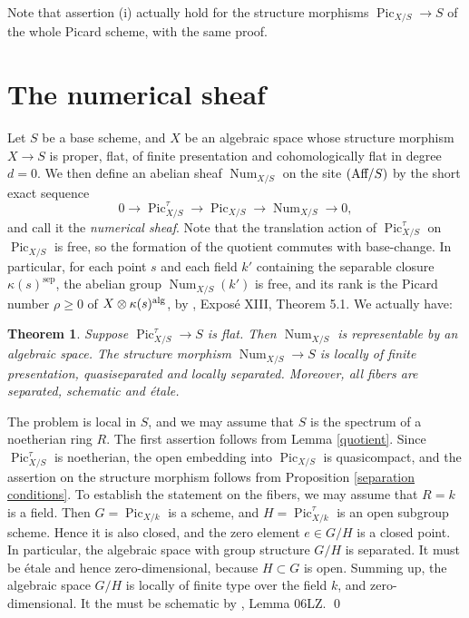 \documentclass[oneside, 12pt]{amsart}
\newcommand\mylabel[1]{\label{#1}\marginpar{\raggedright\vspace{-1ex}\medskip\medskip\footnotesize \tt #1}}
\renewcommand\mylabel[1]{\label{#1}}
\newtheorem{theorem}{Theorem}[section]
\theoremstyle{definition}
\theoremstyle{remark}
\newcommand{\Aff}{\text{\rm Aff}}
\newcommand{\alg}{\text{\rm alg}}
\newcommand{\lra}{\longrightarrow}
\newcommand{\Num}{\operatorname{Num}}
\newcommand{\Pic}{\operatorname{Pic}}
\newcommand{\ra}{\rightarrow}
\newcommand{\sep}{{\operatorname{sep}}}
\begin{document}
\medskip
Note that assertion (i) actually hold for the structure morphisms $\Pic_{X/S}\ra S$ of the whole Picard scheme,
with the same proof.


\section{The numerical sheaf}
\mylabel{Numerical sheaf}

Let $S$ be a base scheme, and $X$ be an algebraic space whose structure morphism $X\ra S$ is proper,
flat, of finite presentation and cohomologically flat in degree $d=0$.
We then define an abelian sheaf $\Num_{X/S}$ on the site $(\Aff/S)$ by the short exact sequence
$$
0\lra \Pic^\tau_{X/S}\lra \Pic_{X/S}\lra \Num_{X/S}\lra 0,
$$
and call it the \emph{numerical sheaf}.
Note that the translation action of $\Pic^\tau_{X/S}$ on $\Pic_{X/S}$ is free, so the formation of the quotient
commutes with base-change. In particular, for each point $s$ and each field $k'$ containing the separable closure $\kappa(s)^\sep$,
the  abelian group $\Num_{X/S}(k')$
is free, and its rank is the Picard number $\rho\geq 0$ of $X\otimes \kappa(s)^\alg$, by \cite{SGA 6}, Expos\'e XIII, Theorem 5.1.
We actually have:

\begin{theorem}
\mylabel{num representable}
Suppose $\Pic^\tau_{X/S}\ra S$ is flat. Then  $\Num_{X/S}$ is representable by an algebraic space. The structure morphism $\Num_{X/S}\ra S$
is locally of finite presentation,  quasiseparated and locally separated. Moreover, all  fibers are separated, schematic and \'etale.
\end{theorem}

\proof
The problem is local in $S$, and we may assume that $S$ is the spectrum of a noetherian ring $R$.
The first assertion follows from Lemma \ref{quotient}. Since $\Pic^\tau_{X/S}$ is noetherian,
the open embedding into $\Pic_{X/S}$ is  quasicompact, and the   assertion on the structure morphism follows from 
Proposition \ref{separation conditions}.
To establish the statement on the fibers, we may assume that $R=k$ is a field.
Then $G=\Pic_{X/k}$ is a scheme, and $H=\Pic^\tau_{X/k}$ is an open subgroup scheme. Hence it is also closed,
and the zero element $e\in G/H$ is a closed point. 
In particular, the algebraic space with group structure $G/H$ is separated. 
It must be \'etale and hence zero-dimensional, because $H\subset G$ is open.
Summing up, the algebraic space $G/H$ is locally of finite type over the field $k$, and zero-dimensional.
It the must be schematic by  \cite{SP}, Lemma 06LZ.
\qed
\end{document}
